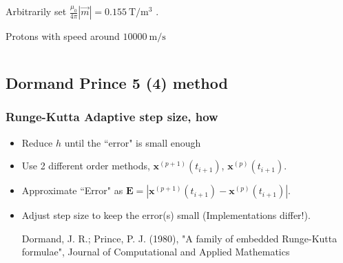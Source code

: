 \documentclass{beamer}
\begin{document}
\begin{frame}
\begin{columns}
\begin{column}{0.5\linewidth}
{{\color{gray}  Arbitrarily set $\frac{\mu_0}{4\pi}|\vec{m}|= \SI{0.155}{\tesla\per\cubic\meter}$ .

 Protons with speed around $\SI{10000}{\meter\per\second}$}


}%
\end{column}
\end{columns}
\end{frame}


\subsection{Dormand Prince 5 (4) method}

\begin{frame}
\frametitle{Runge-Kutta Adaptive step size, how}
\begin{itemize}
\item <1-> Reduce $h$ until the ``error" is small enough

\item <2-> Use 2 different order methods, $\mathbf{x}^{(p+1)}(t_{i+1})$, $\mathbf{x}^{(p)}(t_{i+1})$.

\item <3-> Approximate ``Error" as  $\mathbf{E} = |\mathbf{x}^{(p+1)}(t_{i+1})-\mathbf{x}^{(p)}(t_{i+1})|$.

\item <4-> Adjust step size to keep the error(s) small (Implementations differ!).

{\color{gray} Dormand, J. R.; Prince, P. J. (1980), "A family of embedded Runge-Kutta formulae", Journal of Computational and Applied Mathematics}
\begin{equation}
\end{equation}


\end{itemize}
\end{frame}
\end{document}
